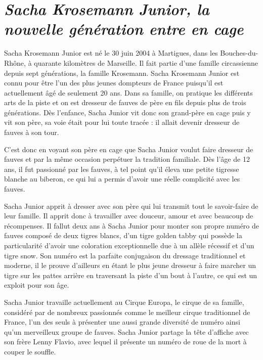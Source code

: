 \section*{\textit{Sacha Krosemann Junior, la nouvelle génération entre en cage}}
{}
\noindent
Sacha Krosemann Junior est né le 30 juin 2004 à Martigues, dans les Bouches-du-Rhône, à quarante kilomètres de Marseille. Il fait partie d'une famille circassienne depuis sept générations, la famille Krosemann. Sacha Krosemann Junior est connu pour être l'un des plus jeunes dompteurs de France puisqu'il est actuellement âgé de seulement 20 ans. Dans sa famille, on pratique les différents arts de la piste et on est dresseur de fauves de père en fils depuis plus de trois générations. Dès l'enfance, Sacha Junior vit donc son grand-père en cage puis y vit son père, sa voie était pour lui toute tracée : il allait devenir dresseur de fauves à son tour.

C'est donc en voyant son père en cage que Sacha Junior voulut faire dresseur de fauves et par la même occasion perpétuer la tradition familiale. Dès l'âge de 12 ans, il fut passionné par les fauves, à tel point qu'il éleva une petite tigresse blanche au biberon, ce qui lui a permis d'avoir une réelle complicité avec les fauves.

Sacha Junior apprit à dresser avec son père qui lui transmit tout le savoir-faire de leur famille. Il apprit donc à travailler avec douceur, amour et avec beaucoup de récompenses. Il fallut deux ans à Sacha Junior pour monter son propre numéro de fauves composé de deux tigres blancs, d'un tigre golden tabby qui possède la particularité d'avoir une coloration exceptionnelle due à un allèle récessif et d'un tigre snow. Son numéro est la parfaite conjugaison du dressage traditionnel et moderne, il le prouve d'ailleurs en étant le plus jeune dresseur à faire marcher un tigre sur les pattes arrière en traversant la piste d'un bout à l'autre, ce qui est un exploit pour son âge.

Sacha Junior travaille actuellement au Cirque Europa, le cirque de sa famille, considéré par de nombreux passionnés comme le meilleur cirque traditionnel de France, l'un des seuls à présenter une aussi grande diversité de numéro ainsi qu'un merveilleux groupe de fauves. Sacha Junior partage la tête d'affiche avec son frère Lenny Flavio, avec lequel il présente un numéro de roue de la mort à couper le souffle.

